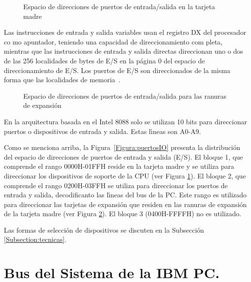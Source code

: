 \begin{figure}[!hbt]
\vskip 5mm
\vskip 80mm
\caption{Espacio de direcciones de puertos de entrada/salida en la tarjeta madre}
\label{Figura:bloque1}
\end{figure}

Las instrucciones de entrada y salida variables usan el registro DX del pro\-ce\-sa\-dor co\-%
mo a\-pun\-ta\-dor, te\-nien\-do una ca\-pa\-ci\-dad de di\-rec\-cio\-na\-mien\-to com\-%
ple\-ta, mien\-tras que las instrucciones de entrada y salida directas direccionan uno o dos de %
las 256 localidades de bytes de E/S en la p\'agina 0 del espacio de direccionamiento de E/S. Los %
puertos de E/S son direccionados de la misma forma que las localidades de %
memoria~\cite{Intel:Micro}.

\begin{figure}[!htb]
\vskip 20mm
\vskip 120mm
\caption{Espacio de direcciones de puertos de entrada/salida para las ranuras de expansi\'on} 
\label{Figura:bloque2}
\end{figure}

En la arquitectura basada en el Intel 8088 solo se utilizan 10 bits para direccionar puertos o %
dispositivos de entrada y salida. Estas l\'{\i}neas son A0-A9. 

Como se menciona arriba, la Figura~\ref{Figura:puertosIO} presenta la distribuci\'on del %
espacio de direcciones de puertos de entrada y salida (E/S). El bloque 1, que comprende el rango %
0000H-01FFH reside en la tarjeta madre y se utiliza para direccionar los dispositivos de soporte %
de la CPU (ver Figura \ref{Figura:bloque1}). El bloque 2, que comprende el rango 0200H-03FFH se %
utiliza para direccionar los puertos de entrada y salida, decodificanto las l\'{\i}neas del bus %
de la PC. Este rango es utilizado para direccionar las tarjetas de expansi\'on que residen en %
las ranuras de expansi\'on de la tarjeta madre (ver Figura \ref{Figura:bloque2}). El bloque 3 %
(0400H-FFFFH) no es utilizado.

Las formas de selecci\'on de dispositivos se discuten en la Subsecci\'on %
\ref{Subsection:tecnicas}.


\section{Bus del Sistema de la IBM PC.}
\label{Section:ranuras}

